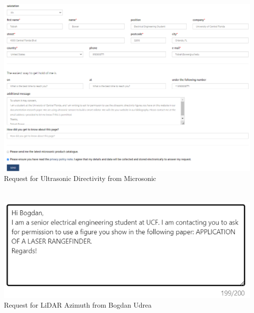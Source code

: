 
\begin{center}
\includegraphics[width=\textwidth]{./Images/permit1.png}
\newline Request for Ultrasonic Directivity from Microsonic\\ \\ \\

\includegraphics[width=\textwidth]{./Images/permit2.png}
\newline Request for LiDAR Azimuth from Bogdan Udrea\\ \\ \\
\end{center}